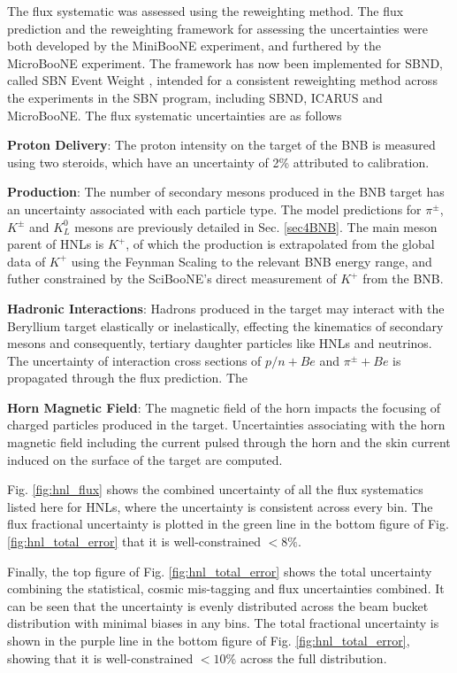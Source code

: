 The flux systematic was assessed using the reweighting method.
The flux prediction and the reweighting framework for assessing the uncertainties were both developed by the MiniBooNE experiment, and furthered by the MicroBooNE experiment.
The framework has now been implemented for SBND, called SBN Event Weight \cite{sbnweight_module}, intended for a consistent reweighting method across the experiments in the SBN program, including SBND, ICARUS and MicroBooNE.
The flux systematic uncertainties are as follows
\begin{coloritemize}
	\item \textbf{Proton Delivery}: The proton intensity on the target of the BNB is measured using two steroids, which have an uncertainty of 2\% attributed to calibration.
	\item \textbf{Production}: The number of secondary mesons produced in the BNB target has an uncertainty associated with each particle type. 
		The model predictions for $\pi^\pm$, $K^\pm$ and $K^0_L$ mesons are previously detailed in Sec. \ref{sec4BNB}.
		The main meson parent of HNLs is $K^+$, of which the production is extrapolated from the global data of $K^+$ using the Feynman Scaling to the relevant BNB energy range, and futher constrained by the SciBooNE's direct measurement of $K^+$ from the BNB.
	\item \textbf{Hadronic Interactions}: Hadrons produced in the target may interact with the Beryllium target elastically or inelastically, effecting the kinematics of secondary mesons and consequently, tertiary daughter particles like HNLs and neutrinos.
		The uncertainty of interaction cross sections of $p/n + Be$ and $\pi^\pm + Be$ is propagated through the flux prediction.
		The
	\item \textbf{Horn Magnetic Field}: The magnetic field of the horn impacts the focusing of charged particles produced in the target.
		Uncertainties associating with the horn magnetic field including the current pulsed through the horn and the skin current induced on the surface of the target are computed.
\end{coloritemize}
Fig. \ref{fig:hnl_flux} shows the combined uncertainty of all the flux systematics listed here for HNLs, where the uncertainty is consistent across every bin.
The flux fractional uncertainty is plotted in the green line in the bottom figure of Fig. \ref{fig:hnl_total_error} that it is well-constrained $< 8\%$.

Finally, the top figure of Fig. \ref{fig:hnl_total_error} shows the total uncertainty combining the statistical, cosmic mis-tagging and flux uncertainties combined.
It can be seen that the uncertainty is evenly distributed across the beam bucket distribution with minimal biases in any bins. 
The total fractional uncertainty is shown in the purple line in the bottom figure of Fig. \ref{fig:hnl_total_error}, showing that it is well-constrained $< 10\%$ across the full distribution.


